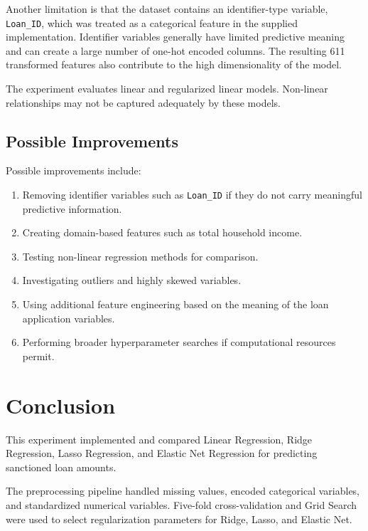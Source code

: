 \documentclass[12pt,a4paper]{article}
\begin{document}
Another limitation is that the dataset contains an identifier-type variable, \texttt{Loan\_ID}, which was treated as a categorical feature in the supplied implementation. Identifier variables generally have limited predictive meaning and can create a large number of one-hot encoded columns. The resulting 611 transformed features also contribute to the high dimensionality of the model.

The experiment evaluates linear and regularized linear models. Non-linear relationships may not be captured adequately by these models.

\subsection{Possible Improvements}

Possible improvements include:

\begin{enumerate}
    \item Removing identifier variables such as \texttt{Loan\_ID} if they do not carry meaningful predictive information.
    \item Creating domain-based features such as total household income.
    \item Testing non-linear regression methods for comparison.
    \item Investigating outliers and highly skewed variables.
    \item Using additional feature engineering based on the meaning of the loan application variables.
    \item Performing broader hyperparameter searches if computational resources permit.
\end{enumerate}

\section{Conclusion}

This experiment implemented and compared Linear Regression, Ridge Regression, Lasso Regression, and Elastic Net Regression for predicting sanctioned loan amounts.

The preprocessing pipeline handled missing values, encoded categorical variables, and standardized numerical variables. Five-fold cross-validation and Grid Search were used to select regularization parameters for Ridge, Lasso, and Elastic Net.
\end{document}
